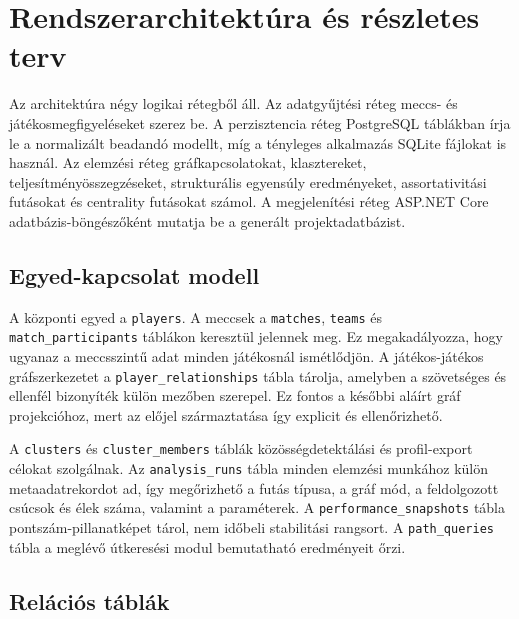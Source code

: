 \documentclass[12pt,a4paper]{article}
\begin{document}
\section{Rendszerarchitektúra és részletes terv}

Az architektúra négy logikai rétegből áll. Az adatgyűjtési réteg meccs- és játékosmegfigyeléseket szerez be. A perzisztencia réteg PostgreSQL táblákban írja le a normalizált beadandó modellt, míg a tényleges alkalmazás SQLite fájlokat is használ. Az elemzési réteg gráfkapcsolatokat, klasztereket, teljesítményösszegzéseket, strukturális egyensúly eredményeket, assortativitási futásokat és centrality futásokat számol. A megjelenítési réteg ASP.NET Core adatbázis-böngészőként mutatja be a generált projektadatbázist.

\subsection{Egyed-kapcsolat modell}

A központi egyed a \texttt{players}. A meccsek a \texttt{matches}, \texttt{teams} és \texttt{match\_participants} táblákon keresztül jelennek meg. Ez megakadályozza, hogy ugyanaz a meccsszintű adat minden játékosnál ismétlődjön. A játékos-játékos gráfszerkezetet a \texttt{player\_relationships} tábla tárolja, amelyben a szövetséges és ellenfél bizonyíték külön mezőben szerepel. Ez fontos a későbbi aláírt gráf projekcióhoz, mert az előjel származtatása így explicit és ellenőrizhető.

A \texttt{clusters} és \texttt{cluster\_members} táblák közösségdetektálási és profil-export célokat szolgálnak. Az \texttt{analysis\_runs} tábla minden elemzési munkához külön metaadatrekordot ad, így megőrizhető a futás típusa, a gráf mód, a feldolgozott csúcsok és élek száma, valamint a paraméterek. A \texttt{performance\_snapshots} tábla pontszám-pillanatképet tárol, nem időbeli stabilitási rangsort. A \texttt{path\_queries} tábla a meglévő útkeresési modul bemutatható eredményeit őrzi.

\subsection{Relációs táblák}
\end{document}
